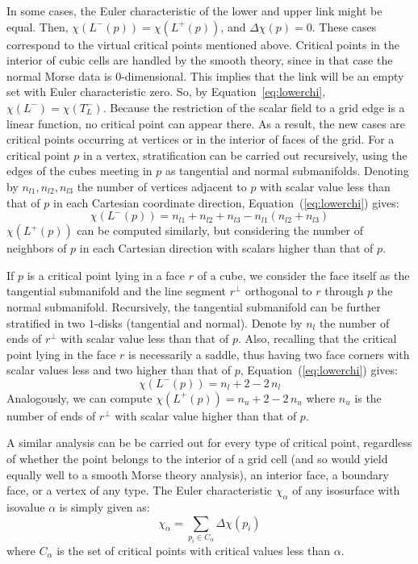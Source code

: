 In some cases, the Euler characteristic of the lower and upper link
might be equal. Then, $\chi(L^-(p)) = \chi(L^+(p))$, and
$\Delta\chi(p) = 0$. These cases correspond to the virtual critical
points mentioned above.
%
Critical points in the interior of cubic cells are handled by the
smooth theory, since in that case the normal Morse data is
0-dimensional. This implies that the link will be an empty set with
Euler characteristic zero. So, by Equation~\ref{eq:lowerchi},
$\chi(L^-) = \chi(T_L^-)$. Because the restriction of the scalar field
to a grid edge is a linear function, no critical point can appear
there. As a result, the new cases are critical points occurring at
vertices or in the interior of faces of the grid.  For a critical
point $p$ in a vertex, stratification can be carried out recursively,
using the edges of the cubes meeting in $p$ as tangential and normal
submanifolds. Denoting by $n_{l1},n_{l2},n_{l3}$ the number of
vertices adjacent to $p$ with scalar value less than that of $p$ in
each Cartesian coordinate direction, Equation~(\ref{eq:lowerchi})
gives:
\begin{equation}
\chi(L^-(p)) = n_{l1}+n_{l2}+n_{l3} - n_{l1}(n_{l2}+n_{l3})
\end{equation}
$\chi(L^+(p))$ can be computed similarly, but considering the number of neighbors of $p$ in each Cartesian 
direction with scalars higher than that of $p$.

If $p$ is a critical point lying in a face $r$ of a cube, we consider
the face itself as the tangential submanifold and the line segment
$r^\perp$ orthogonal to $r$ through $p$ the normal submanifold.
Recursively, the tangential submanifold can be further stratified in
two $1$-disks (tangential and normal).  Denote by $n_l$ the number of
ends of $r^\perp$ with scalar value less than that of $p$. Also,
recalling that the critical point lying in the face $r$ is necessarily
a saddle, thus having two face corners with scalar values less and two
higher than that of $p$, Equation~(\ref{eq:lowerchi}) gives:
\begin{equation}
\chi(L^-(p)) = n_l+2 - 2\,n_l
\end{equation}
Analogously, we can compute $\chi(L^+(p)) = n_u+2 - 2\,n_u$ where
$n_u$ is the number of ends of $r^\perp$ with scalar value higher than
that of $p$.

A similar analysis can be be carried out for every type of critical
point, regardless of whether the point belongs to the interior of a
grid cell (and so would yield equally well to a smooth Morse theory
analysis), an interior face, a boundary face, or a vertex of any
type. The Euler characteristic $\chi_\alpha$ of any isosurface with
isovalue $\alpha$ is simply given as:
\begin{equation}
\chi_\alpha = \sum_{p_i\in C_\alpha} \Delta\chi(p_i)
\label{ref:chis}
\end{equation}
where $C_\alpha$ is the set of critical points with critical values less than $\alpha$.

